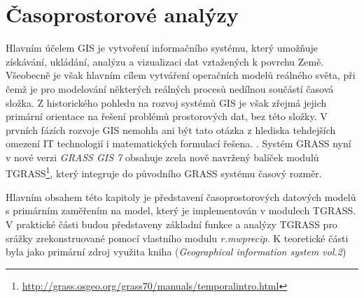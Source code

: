 \documentclass[a4paper,12pt,oneside]{report}
\begin{document}
\section{Časoprostorové analýzy}
Hlavním účelem GIS je vytvoření informačního systému, který umožňuje
získávání, ukládání, analýzu a vizualizaci dat vztažených k povrchu Země.  Všeobecně je však hlavním cílem vytváření operačních modelů reálného světa, při čemž je pro modelování některých reálných procesů nedílnou součástí časová složka.  Z historického pohledu na rozvoj systémů GIS je však zřejmá jejich primární orientace na řešení problémů  prostorových dat, bez této složky. V prvních fázích rozvoje GIS nemohla ani být 
tato otázka z hlediska tehdejších omezení IT technologií i matematických
 formulací řešena. \cite{geospatialanal}. Systém GRASS nyní v nové verzi
\textit{GRASS GIS 7 } obsahuje zcela nově navržený balíček modulů
TGRASS\footnote{\url{http://grass.osgeo.org/grass70/manuals/temporalintro.html}},
který integruje do původního GRASS systému časový rozměr.

Hlavním obsahem této kapitoly je představení časoprostorových
datových modelů s primárním zaměřením na model, který je implementován
v modulech TGRASS. V praktické části budou představeny základní funkce
a analýzy TGRASS pro  srážky zrekonstruované pomocí vlastního modulu
\textit{r.mwprecip}. K teoretické části byla jako primární zdroj
využita kniha (\textit{Geographical information system vol.2})\cite{gistemporal}
\end{document}
